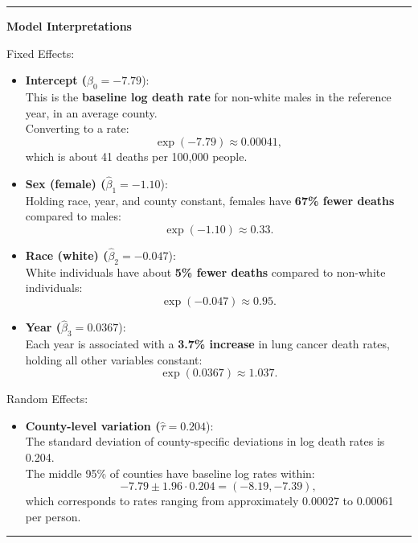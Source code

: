 \documentclass[
  letterpaper,
  DIV=11,
  numbers=noendperiod]{scrreprt}
\providecommand{\tightlist}{%
  \setlength{\itemsep}{0pt}\setlength{\parskip}{0pt}}\usepackage{longtable,booktabs,array}
\begin{document}
\begin{center}\rule{0.5\linewidth}{0.5pt}\end{center}

\textbf{Model Interpretations}

Fixed Effects:

\begin{itemize}
\item
  \textbf{Intercept (}\(\hat{\beta}_0 = -7.79\)):\\
  This is the \textbf{baseline log death rate} for non-white males in
  the reference year, in an average county.\\
  Converting to a rate:\\
  \[
  \exp(-7.79) \approx 0.00041,
  \] which is about 41 deaths per 100,000 people.
\item
  \textbf{Sex (female) (}\(\hat{\beta}_1 = -1.10\)):\\
  Holding race, year, and county constant, females have \textbf{67\%
  fewer deaths} compared to males:\\
  \[
  \exp(-1.10) \approx 0.33.
  \]
\item
  \textbf{Race (white) (}\(\hat{\beta}_2 = -0.047\)):\\
  White individuals have about \textbf{5\% fewer deaths} compared to
  non-white individuals:\\
  \[
  \exp(-0.047) \approx 0.95.
  \]
\item
  \textbf{Year (}\(\hat{\beta}_3 = 0.0367\)):\\
  Each year is associated with a \textbf{3.7\% increase} in lung cancer
  death rates, holding all other variables constant:\\
  \[
  \exp(0.0367) \approx 1.037.
  \]
\end{itemize}

Random Effects:

\begin{itemize}
\tightlist
\item
  \textbf{County-level variation (}\(\hat{\tau} = 0.204\)):\\
  The standard deviation of county-specific deviations in log death
  rates is 0.204.\\
  The middle 95\% of counties have baseline log rates within: \[
  -7.79 \pm 1.96 \cdot 0.204 = (-8.19, -7.39),
  \] which corresponds to rates ranging from approximately 0.00027 to
  0.00061 per person.
\end{itemize}

\begin{center}\rule{0.5\linewidth}{0.5pt}\end{center}
\end{document}
